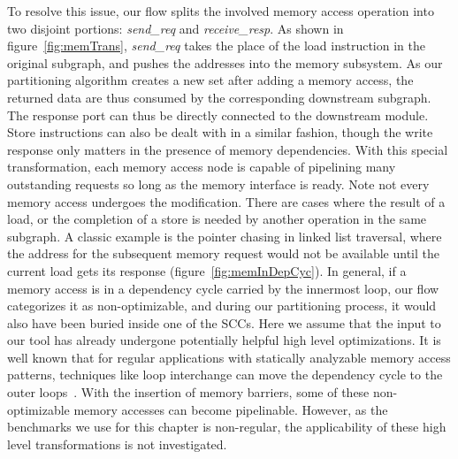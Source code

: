 To resolve this issue, our flow splits the involved
memory access operation into two disjoint portions:
\textit{send\_req} and \textit{receive\_resp}. %
As shown in figure~\ref{fig:memTrans}, \textit{send\_req}%
 takes the place of the load instruction in the original subgraph,
and pushes the addresses into the memory subsystem. %
As our partitioning
algorithm creates a new set 
after adding a memory
access, the returned data are %
thus consumed by the corresponding downstream subgraph.
The response port can thus be directly connected to the downstream module.
Store instructions can also be dealt with in a similar fashion, though
the write response only matters in the presence of memory dependencies. 
With this special transformation, each
memory access node is capable of pipelining many outstanding
requests so long as the memory interface is ready.
Note not every memory access undergoes the modification.
There are cases where the result of a load, or the completion of
a store is needed by another operation in the same subgraph.
A classic example is the pointer
chasing in linked list traversal, where the address for the
subsequent memory request would not be available until the
current load gets its response (figure~\ref{fig:memInDepCyc}). In general, if a memory access is in a dependency cycle carried by the innermost loop, our
flow categorizes it as non-optimizable, and during our partitioning process,
it would also have been buried inside one of the SCCs. Here we assume that
the input to our tool has already undergone potentially helpful
high level optimizations. It is well known that for regular
applications with statically analyzable memory access patterns,
techniques like loop interchange can move the dependency
cycle to the outer loops~\cite{Kennedy:2001:OCM:502981}. With the insertion
of memory barriers, some of these non-optimizable memory accesses can become pipelinable. However, as the benchmarks we use for this chapter is non-regular, the applicability
of these high level transformations is not investigated.


